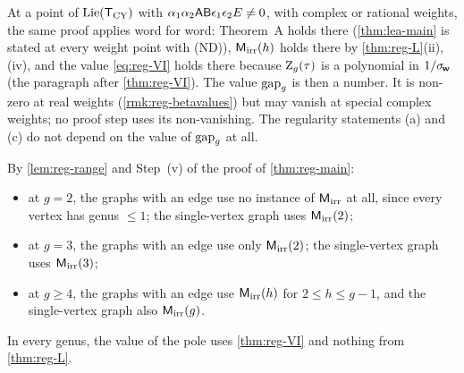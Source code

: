 \begin{rmk}
\label{rmk:reg-special}
At a point of $\mathrm{Lie}(\mathsf{T}_{\mathrm{CY}})$ with $\alpha_1\alpha_2\mathsf{A}\mathsf{B}\epsilon_1\epsilon_2E\neq 0$, with complex or rational weights, the same proof applies word for word: Theorem~A holds there (\cref{thm:lea-main} is stated at every weight point with (ND)), $\mathsf{M}_{\mathrm{irr}}(h)$ holds there by \cref{thm:reg-L}(ii), (iv), and the value \eqref{eq:reg-VI} holds there because $\mathrm{Z}_g(\tau)$ is a polynomial in $1/\sigma_{\!\mathbf{w}}$ (the paragraph after \cref{thm:reg-VI}). The value $\mathrm{gap}_g$ is then a number. It is non-zero at real weights (\cref{rmk:reg-betavalues}) but may vanish at special complex weights; no proof step uses its non-vanishing. The regularity statements (a) and (c) do not depend on the value of $\mathrm{gap}_g$ at all.
\end{rmk}

\begin{rmk}
\label{rmk:reg-genus}
By \cref{lem:reg-range} and Step~(v) of the proof of \cref{thm:reg-main}:
\begin{itemize}
\item at $g=2$, the graphs with an edge use no instance of $\mathsf{M}_{\mathrm{irr}}$ at all, since every vertex has genus $\leq 1$; the single-vertex graph uses $\mathsf{M}_{\mathrm{irr}}(2)$;
\item at $g=3$, the graphs with an edge use only $\mathsf{M}_{\mathrm{irr}}(2)$; the single-vertex graph uses $\mathsf{M}_{\mathrm{irr}}(3)$;
\item at $g\geq 4$, the graphs with an edge use $\mathsf{M}_{\mathrm{irr}}(h)$ for $2\leq h\leq g-1$, and the single-vertex graph also $\mathsf{M}_{\mathrm{irr}}(g)$.
\end{itemize}
In every genus, the value of the pole uses \cref{thm:reg-VI} and nothing from \cref{thm:reg-L}. 
\end{rmk}
